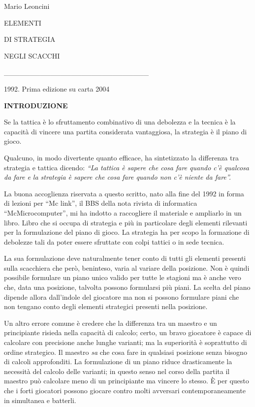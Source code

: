Mario Leoncini

ELEMENTI

DI STRATEGIA

NEGLI SCACCHI

\_\_\_\_\_\_\_\_\_\_\_\_\_\_\_\_\_\_\_\_\_\_\_\_\_\_\_\_

1992. Prima edizione su carta 2004

\textbf{INTRODUZIONE}

Se la tattica è lo sfruttamento combinativo di una debolezza e la
tecnica è la capacità di vincere una partita considerata vantaggiosa, la
strategia è il piano di gioco.

Qualcuno, in modo divertente quanto efficace, ha sintetizzato la
differenza tra strategia e tattica dicendo: \emph{``La tattica è sapere
che cosa fare quando c'è qualcosa da fare e la strategia è sapere che
cosa fare quando non c'è niente da fare''.}

La buona accoglienza riservata a questo scritto, nato alla fine del 1992
in forma di lezioni per ``Mc link'', il BBS della nota rivista di
informatica ``McMicrocomputer'', mi ha indotto a raccogliere il
materiale e ampliarlo in un libro. Libro che si occupa di strategia e
più in particolare degli elementi rilevanti per la formulazione del
piano di gioco. La strategia ha per scopo la formazione di debolezze
tali da poter essere sfruttate con colpi tattici o in sede tecnica.

La sua formulazione deve naturalmente tener conto di tutti gli elementi
presenti sulla scacchiera che però, beninteso, varia al variare della
posizione. Non è quindi possibile formulare un piano unico valido per
tutte le stagioni ma è anche vero che, data una posizione, talvolta
possono formularsi più piani. La scelta del piano dipende allora
dall'indole del giocatore ma non si possono formulare piani che non
tengano conto degli elementi strategici presenti nella posizione.

Un altro errore comune è credere che la differenza tra un maestro e un
principiante risieda nella capacità di calcolo; certo, un bravo
giocatore è capace di calcolare con precisione anche lunghe varianti; ma
la superiorità è soprattutto di ordine strategico. Il maestro \emph{sa}
che cosa fare in qualsiasi posizione senza bisogno di calcoli
approfonditi. La formulazione di un piano riduce drasticamente la
necessità del calcolo delle varianti; in questo senso nel corso della
partita il maestro può calcolare meno di un principiante ma vincere lo
stesso. È per questo che i forti giocatori possono giocare contro molti
avversari contemporaneamente in simultanea e batterli.

